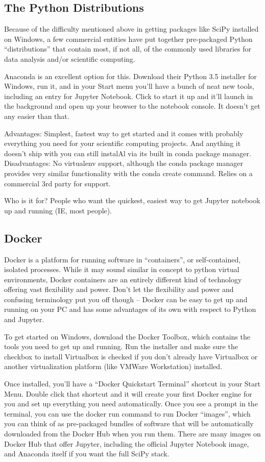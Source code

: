 \subsection{The Python Distributions}
Because of the difficulty mentioned above in getting packages like SciPy installed on Windows, a few commercial entities have put together pre-packaged Python ``distributions'' that contain most, if not all, of the commonly used libraries for data analysis and/or scientific computing.

Anaconda is an excellent option for this. Download their Python 3.5 installer for Windows, run it, and in your Start menu you'll have a bunch of neat new tools, including an entry for Jupyter Notebook. Click to start it up and it'll launch in the background and open up your browser to the notebook console. It doesn't get any easier than that.

Advantages: Simplest, fastest way to get started and it comes with probably everything you need for your scientific computing projects. And anything it doesn't ship with you can still instalAl via its built in conda package manager.
Disadvantages: No virtualenv support, although the conda package manager provides very similar functionality with the conda create command. Relies on a commercial 3rd party for support.

Who is it for? People who want the quickest, easiest way to get Jupyter notebook up and running (IE, most people).

\subsection{Docker}
Docker is a platform for running software in ``containers'', or self-contained, isolated processes. While it may sound similar in concept to python virtual environments, Docker containers are an entirely different kind of technology offering vast flexibility and power. Don't let the flexibility and power and confusing terminology put you off though -- Docker can be easy to get up and running on your PC and has some advantages of its own with respect to Python and Jupyter.

To get started on Windows, download the Docker Toolbox, which contains the tools you need to get up and running. Run the installer and make sure the checkbox to install Virtualbox is checked if you don't already have Virtualbox or another virtualization platform (like VMWare Workstation) installed.

Once installed, you'll have a ``Docker Quickstart Terminal'' shortcut in your Start Menu. Double click that shortcut and it will create your first Docker engine for you and set up everything you need automatically. Once you see a prompt in the terminal, you can use the docker run command to run Docker ``images'', which you can think of as pre-packaged bundles of software that will be automatically downloaded from the Docker Hub when you run them. There are many images on Docker Hub that offer Jupyter, including the official Jupyter Notebook image, and Anaconda itself if you want the full SciPy stack.

